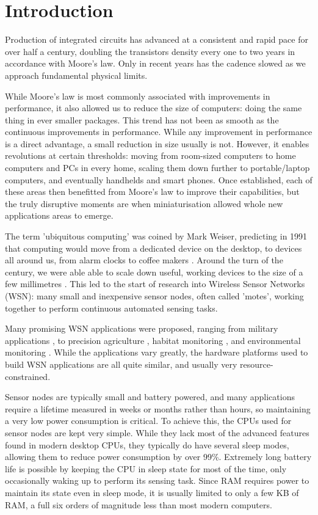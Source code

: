 \chapter{Introduction}

Production of integrated circuits has advanced at a consistent and rapid pace for over half a century, doubling the transistors density every one to two years in accordance with Moore's law. Only in recent years has the cadence slowed as we approach fundamental physical limits.

While Moore's law is most commonly associated with improvements in performance, it also allowed us to reduce the size of computers: doing the same thing in ever smaller packages. This trend has not been as smooth as the continuous improvements in performance. While any improvement in performance is a direct advantage, a small reduction in size usually is not. However, it enables revolutions at certain thresholds: moving from room-sized computers to home computers and PCs in every home,  scaling them down further to portable/laptop computers, and eventually handhelds and smart phones. Once established, each of these areas then benefitted from Moore's law to improve their capabilities, but the truly disruptive moments are when miniaturisation allowed whole new applications areas to emerge.

The term 'ubiquitous computing' was coined by Mark Weiser, predicting in 1991 that computing would move from a dedicated device on the desktop, to devices all around us, from alarm clocks to coffee makers \cite{Weiser:1991wz}. Around the turn of the century, we were able able to scale down useful, working devices to the size of a few millimetres \cite{Warneke:2001ui}. This led to the start of research into Wireless Sensor Networks (WSN): many small and inexpensive sensor nodes, often called 'motes', working together to perform continuous automated sensing tasks.

Many promising WSN applications were proposed, ranging from military applications \cite{Arora:2004}, to precision agriculture \cite{Langendoen:2006un}, habitat monitoring \cite{Mainwaring:2002wb}, and environmental monitoring \cite{WernerAllen:2006ta, Chang:2010ek}. While the applications vary greatly, the hardware platforms used to build WSN applications are all quite similar, and usually very resource-constrained.

Sensor nodes are typically small and battery powered, and many applications require a lifetime measured in weeks or months rather than hours, so maintaining a very low power consumption is critical. To achieve this, the CPUs used for sensor nodes are kept very simple. While they lack most of the advanced features found in modern desktop CPUs, they typically do have several sleep modes, allowing them to reduce power consumption by over 99\%. Extremely long battery life is possible by keeping the CPU in sleep state for most of the time, only occasionally waking up to perform its sensing task. Since RAM requires power to maintain its state even in sleep mode, it is usually limited to only a few KB of RAM, a full six orders of magnitude less than most modern computers.

